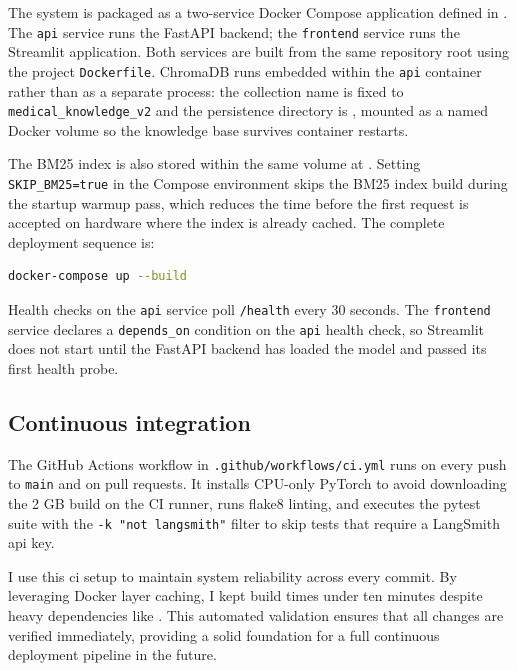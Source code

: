 The system is packaged as a two-service Docker Compose application defined in . The \texttt{api} service runs the FastAPI backend; the \texttt{frontend} service runs the Streamlit application. Both services are built from the same repository root using the project \texttt{Dockerfile}. ChromaDB runs embedded within the \texttt{api} container rather than as a separate process: the collection name is fixed to \texttt{medical\_knowledge\_v2} and the persistence directory is , mounted as a named Docker volume so the knowledge base survives container restarts.

The BM25 index is also stored within the same volume at . Setting \texttt{SKIP\_BM25=true} in the Compose environment skips the BM25 index build during the startup warmup pass, which reduces the time before the first request is accepted on hardware where the index is already cached. The complete deployment sequence is:

\begin{lstlisting}[language=bash, caption=Docker Compose deployment]
docker-compose up --build
\end{lstlisting}

Health checks on the \texttt{api} service poll \texttt{/health} every 30 seconds. The \texttt{frontend} service declares a \texttt{depends\_on} condition on the \texttt{api} health check, so Streamlit does not start until the FastAPI backend has loaded the model and passed its first health probe.

\subsection{Continuous integration}

The GitHub Actions workflow in \texttt{.github/workflows/ci.yml} runs on every push to \texttt{main} and on pull requests. It installs CPU-only PyTorch to avoid downloading the 2 GB build on the CI runner, runs flake8 linting, and executes the pytest suite with the \texttt{-k "not langsmith"} filter to skip tests that require a LangSmith \ac{api} key.

I use this \ac{ci} setup to maintain system reliability across every commit. By leveraging Docker layer caching, I kept build times under ten minutes despite heavy dependencies like . This automated validation ensures that all changes are verified immediately, providing a solid foundation for a full continuous deployment pipeline in the future.

